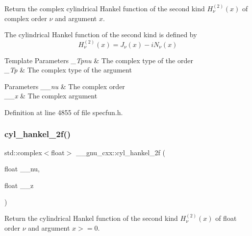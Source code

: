Return the complex cylindrical Hankel function of the second kind $ H^{(2)}_\nu(x) $ of complex order $ \nu $ and argument $ x $.

The cylindrical Hankel function of the second kind is defined by \[ H^{(2)}_\nu(x) = J_\nu(x) - i N_\nu(x) \]


\begin{DoxyTemplParams}{Template Parameters}
{\em \+\_\+\+Tpnu} & The complex type of the order \\
\hline
{\em \+\_\+\+Tp} & The complex type of the argument \\
\hline
\end{DoxyTemplParams}

\begin{DoxyParams}{Parameters}
{\em \+\_\+\+\_\+nu} & The complex order \\
\hline
{\em \+\_\+\+\_\+x} & The complex argument \\
\hline
\end{DoxyParams}


Definition at line 4855 of file specfun.\+h.

\mbox{\label{group__gnu__math__spec__func_ga2b75361870975c47d57bed71b4064ce7}} 
\subsubsection{\texorpdfstring{cyl\+\_\+hankel\+\_\+2f()}{cyl\_hankel\_2f()}\hspace{0.1cm}{\footnotesize\ttfamily [1/2]}}
{\footnotesize\ttfamily std\+::complex$<$float$>$ \+\_\+\+\_\+gnu\+\_\+cxx\+::cyl\+\_\+hankel\+\_\+2f (\begin{DoxyParamCaption}\item[{float}]{\+\_\+\+\_\+nu,  }\item[{float}]{\+\_\+\+\_\+z }\end{DoxyParamCaption})\hspace{0.3cm}{\ttfamily [inline]}}

Return the cylindrical Hankel function of the second kind $ H^{(2)}_\nu(x) $ of {\ttfamily float} order $ \nu $ and argument $ x >= 0 $.

